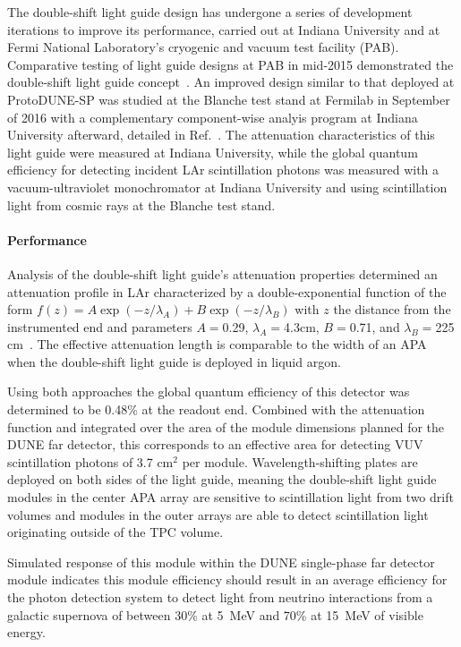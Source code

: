 The double-shift light guide design has undergone a series of development 
iterations to improve its performance, carried out at Indiana University and at 
Fermi National Laboratory's cryogenic and vacuum test facility (PAB). 
Comparative testing of light guide designs at PAB in mid-2015 demonstrated 
the double-shift light guide concept~\cite{bib:JINST-11-C05019}.
 An improved design similar to that deployed at ProtoDUNE-SP was studied at 
the Blanche test stand at Fermilab in September of 2016 with a complementary 
component-wise analyis program at Indiana University afterward, detailed in 
Ref.~\cite{bib:DoubleShiftLG-NIM-171113}. The attenuation characteristics of 
this light guide were measured at Indiana University, while the global quantum 
efficiency for detecting incident LAr scintillation photons was measured with 
a vacuum-ultraviolet monochromator at Indiana University and using 
scintillation light from cosmic rays at the Blanche test stand.

\paragraph*{Performance}

Analysis of the double-shift light guide's attenuation properties determined 
an attenuation profile in LAr characterized by a double-exponential function
 of the form $f(z) = A \exp(-z/\lambda_{A}) + B \exp(-z/\lambda_B)$ with $z$ 
the distance from the instrumented end and parameters $A = $0.29,
 $\lambda_A = $4.3cm, $B = $0.71, and $\lambda_B = $225 cm~\cite{bib:DoubleShiftLG-NIM-171113}. 
The effective attenuation length is comparable to the width of an APA 
when the double-shift light guide is deployed in liquid argon.

Using both approaches the global quantum efficiency of this detector was 
determined to be 0.48\% at the readout end. Combined with the attenuation 
function and integrated over the area of the module dimensions planned for
 the DUNE far detector, this corresponds to an effective area for detecting
 VUV scintillation photons of 3.7 cm$^{2}$ per module. Wavelength-shifting 
plates are deployed on both sides of the light guide, meaning the double-shift
 light guide modules in the center APA array are sensitive to scintillation 
light from two drift volumes and modules in the outer arrays are able to detect
 scintillation light originating outside of the TPC volume.

Simulated response of this module within the DUNE single-phase far detector module 
indicates this module efficiency should result in an average efficiency for the 
photon detection system to detect light from neutrino interactions from a galactic 
supernova of between 30\% at 5~MeV and 70\% at 15~MeV of visible energy.

